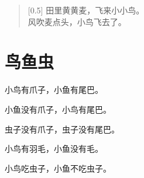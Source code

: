 \documentclass[12pt,UTF-8,openany]{ctexbook}
\begin{document}
\begin{large}
    
    \begin{verse}[0.5\linewidth]
        田里黄黄麦，飞来小小鸟。 \\
        风吹麦点头，小鸟飞去了。
    \end{verse}
    
\end{large}


\clearpage

\begin{center}
    
\end{center}


\hanzibox{}\hanzibox{}\hanzibox{}\hanzibox{}\hspace{1em}\hanzibox{}\hanzibox{}\hanzibox{}\hanzibox{}

\hanzibox{}\hanzibox{}\hanzibox{}\hanzibox{}\hspace{1em}\hanzibox{}\hanzibox{}\hanzibox{}\hanzibox{}

\hanzibox{}\hanzibox{}\hanzibox{}\hanzibox{}\hspace{1em}\hanzibox{}\hanzibox{}\hanzibox{}\hanzibox{}






\chapter{鸟鱼虫}

\begin{large}
    
    小鸟有爪子，小鱼有尾巴。
    
    小鱼没有爪子，小鸟有尾巴。
    
    虫子没有爪子，虫子没有尾巴。
    
    小鸟有羽毛，小鱼没有毛。
    
    小鸟吃虫子，小鱼不吃虫子。
    
\end{large}


\clearpage

\begin{center}
    
\end{center}
\end{document}
